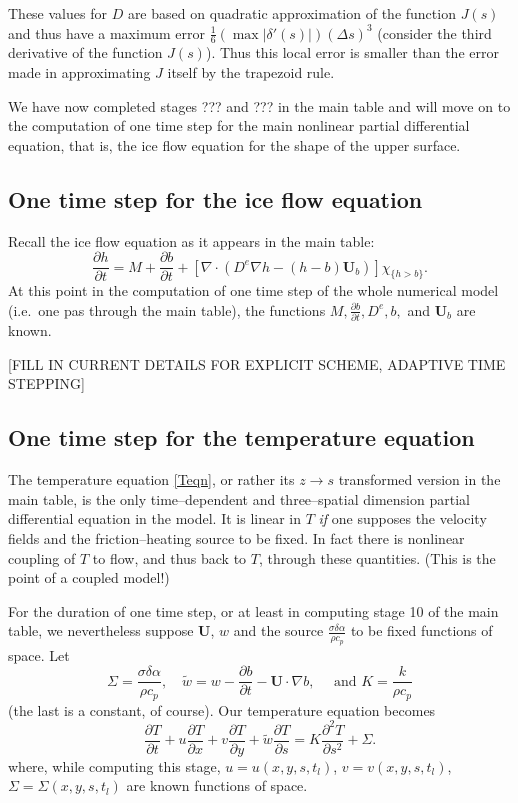 \documentclass[12pt,final]{amsart}%
\theoremstyle{plain}
\theoremstyle{definition}
\theoremstyle{remark}
\newcommand{\ddt}[1]{\ensuremath{\frac{\partial #1}{\partial t}}}
\newcommand{\ddx}[1]{\ensuremath{\frac{\partial #1}{\partial x}}}
\newcommand{\ddy}[1]{\ensuremath{\frac{\partial #1}{\partial y}}}
\newcommand{\dds}[1]{\ensuremath{\frac{\partial #1}{\partial s}}}
\newcommand{\dddsds}[1]{\ensuremath{\frac{\partial^2 #1}{\partial s^2}}}
\newcommand{\diverg}{\nabla\cdot}
\newcommand{\grad}{\nabla}
\newcommand{\bU}{{\mathbf{U}}}
\begin{document}
These values for $D$ are based on quadratic approximation of the function $J(s)$ and thus have a maximum error $\frac{1}{6} \left(\max |\delta'(s)|\right) (\Delta s)^3$ (consider the third derivative of the function $J(s)$).  Thus this local error is smaller than the error made in approximating $J$ itself by the trapezoid rule.

We have now completed stages ??? and ??? in the main table and will move on to the computation of one time step for the main nonlinear partial differential equation, that is, the ice flow equation for the shape of the upper surface.

\subsection*{One time step for the ice flow equation}  Recall the ice flow equation as it appears in the main table:
\begin{equation}\label{iceagain}
\ddt{h}= M + \ddt{b} + \left[\diverg \left(D^e \grad h - (h-b)\bU_b\right)\right]\chi_{\{h>b\}}.\end{equation}
At this point in the computation of one time step of the whole numerical model (i.e.~one pas through the main table), the functions $M,\ddt{b},D^e,b,$ and $\bU_b$ are known.

[FILL IN CURRENT DETAILS FOR EXPLICIT SCHEME, ADAPTIVE TIME STEPPING]

\subsection*{One time step for the temperature equation}

The temperature equation \eqref{Teqn}, or rather its $z\to s$ transformed version in the main table, is the only time--dependent and three--spatial dimension partial differential equation in the model.  It is linear in $T$ \emph{if} one supposes the velocity fields and the friction--heating source to be fixed.  In fact there is nonlinear coupling of $T$ to flow, and thus back to $T$, through these quantities.  (This is the point of a coupled model!)

For the duration of one time step, or at least in computing stage 10 of the main table, we nevertheless suppose $\bU$, $w$ and the source $\frac{\sigma\delta\alpha}{\rho c_p}$ to be fixed functions of space.  Let
    $$\Sigma = \frac{\sigma\delta\alpha}{\rho c_p}, \quad \tilde w=w-\ddt{b}-\bU\cdot \grad b, \quad \text{ and } K=\frac{k}{\rho c_p}$$
(the last is a constant, of course).  Our temperature equation becomes
\begin{equation}\label{simpTemp}
\ddt{T}+u\ddx{T}+v\ddy{T}+\tilde w \dds{T} = K \dddsds{T}+\Sigma.
\end{equation}
where, while computing this stage, $u=u(x,y,s,t_l)$, $v=v(x,y,s,t_l)$, $\Sigma=\Sigma(x,y,s,t_l)$ are known functions of space.
\end{document}
